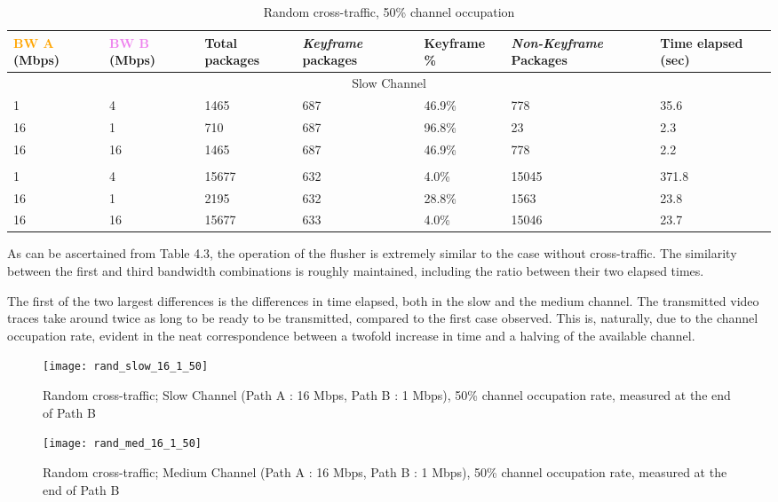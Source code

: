\begin{table}[htbp]
\break
\setlength{\arrayrulewidth}{1mm}
\setlength{\tabcolsep}{12pt}
\renewcommand{\arraystretch}{1.5}
 {
\begin{tabular}{ |p{1.375cm}|p{1.375cm}|p{1.25cm}|p{1.5cm}|p{1.5cm}|p{1.75cm}|p{1.5cm}| }
\hline
\textcolor{orange}{BW A} (Mbps)&\textcolor{violet}{BW B} (Mbps)& Total packages & \textit{Keyframe} packages & Keyframe \% & \textit{Non-Keyframe} Packages & Time elapsed (sec) \\
\hline
\multicolumn{7}{|c|}{Slow Channel} \\
\hline
1&4&1465&687&46.9\%&778&35.6\\
16&1&710&687&96.8\%&23&2.3\\
16&16&1465&687&46.9\%&778&2.2\\
\hline
\rowcolor{white}\multicolumn{7}{|c|}{Medium Channel} \\
\hline
1&4&15677&632&4.0\%&15045&371.8\\
16&1&2195&632&28.8\%&1563&23.8\\
16&16&15677&633&4.0\%&15046&23.7\\
\hline
\end{tabular}
}
\caption{Random cross-traffic, 50\% channel occupation}
\end{table}

As can be ascertained from Table 4.3, the operation of the flusher is extremely similar to the case without cross-traffic. The similarity between the first and third bandwidth combinations is roughly maintained, including the ratio between their two elapsed times.

The first of the two largest differences is the differences in time elapsed, both in the slow and the medium channel. The transmitted video traces take around twice as long to be ready to be transmitted, compared to the first case observed. This is, naturally, due to the channel occupation rate, evident in the neat correspondence between a twofold increase in time and a halving of the available channel. 


\begin{figure}[!h]
\centering
\texttt{[image: rand\_slow\_16\_1\_50]}
\caption{Random cross-traffic; Slow Channel (Path A : 16 Mbps, Path B : 1 Mbps), 50\% channel occupation rate, measured at the end of Path B}
\end{figure}

\begin{figure}[!h]
\centering
\texttt{[image: rand\_med\_16\_1\_50]}
\caption{Random cross-traffic; Medium Channel (Path A : 16 Mbps, Path B : 1 Mbps), 50\% channel occupation rate, measured at the end of Path B}
\end{figure}

